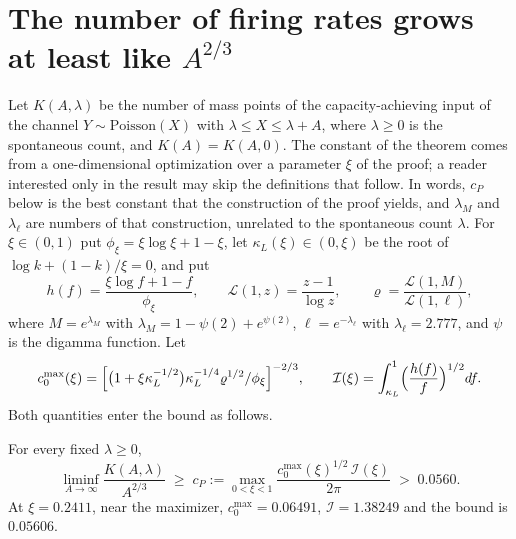 
\section{The number of firing rates grows at least like $A^{2/3}$}\label{sec:thmC}

Let $K(A,\lambda)$ be the number of mass points of the capacity-achieving input of the channel $Y\sim\mathrm{Poisson}(X)$ with
$\lambda\le X\le\lambda+A$, where $\lambda\ge0$ is the spontaneous count, and $K(A)=K(A,0)$. The constant of the theorem comes from a one-dimensional optimization over a parameter
$\xi$ of the proof; a reader interested only in the result may skip the definitions that follow. In words, $c_P$ below is the best
constant that the construction of the proof yields, and $\lambda_M$ and $\lambda_\ell$ are numbers of that construction, unrelated to
the spontaneous count $\lambda$. For $\xi\in(0,1)$ put $\phi_\xi=\xi\log\xi+1-\xi$, let $\kappa_L(\xi)\in(0,\xi)$ be the root of
$\log k+(1-k)/\xi=0$, and put
\[
h(f)=\frac{\xi\log f+1-f}{\phi_\xi},\qquad
\mathcal L(1,z)=\frac{z-1}{\log z},\qquad
\varrho=\frac{\mathcal L(1,M)}{\mathcal L(1,\ell)},
\]
where $M=e^{\lambda_M}$ with $\lambda_M=1-\psi(2)+e^{\psi(2)}$, $\ell=e^{-\lambda_\ell}$ with $\lambda_\ell=2.777$, and $\psi$ is the
digamma function. Let
\[
c_{0}^{\max}(\xi)=\Bigl[\bigl(1+\xi\kappa_L^{-1/2}\bigr)\kappa_L^{-1/4}\varrho^{1/2}/\phi_\xi\Bigr]^{-2/3},\qquad
\mathcal I(\xi)=\int_{\kappa_L}^{1}\Bigl(\frac{h(f)}{f}\Bigr)^{1/2}df .
\]
Both quantities enter the bound as follows.

\begin{theorem}\label{thm:C}
For every fixed $\lambda\ge0$,
\[
\liminf_{A\to\infty}\frac{K(A,\lambda)}{A^{2/3}}\;\ge\;c_P:=\max_{0<\xi<1}\frac{c_{0}^{\max}(\xi)^{1/2}\,\mathcal I(\xi)}{2\pi}\;>\;0.0560 .
\]
At $\xi=0.2411$, near the maximizer, $c_{0}^{\max}=0.06491$, $\mathcal I=1.38249$ and the bound is $0.05606$.
\end{theorem}

